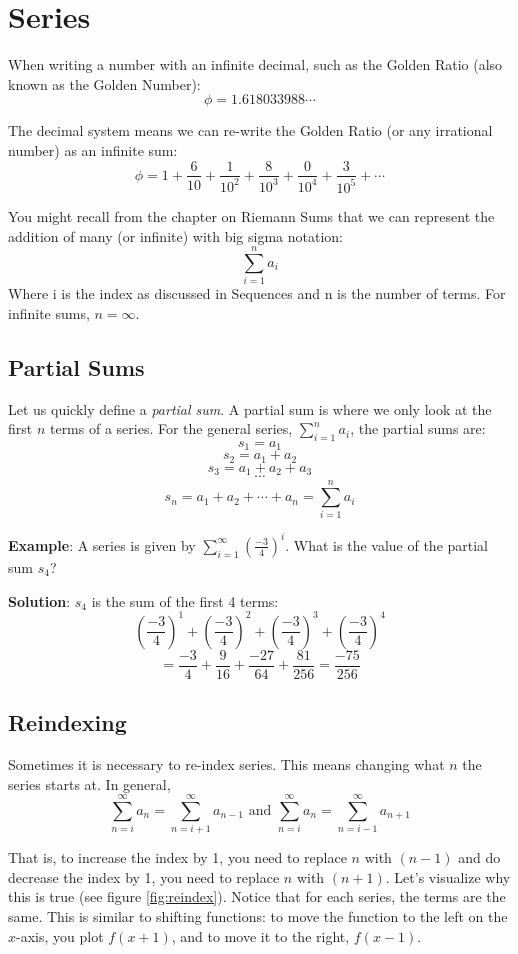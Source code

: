 \chapter{Series}
When writing a number with an infinite decimal, such as the Golden 
Ratio (also known as the Golden Number):
$$\phi = 1.618033988 \cdots$$

The decimal system means we can re-write the Golden Ratio (or any 
irrational number) as an infinite sum:
$$\phi = 1 + \frac{6}{10} + \frac{1}{10^2} + \frac{8}{10^3} + 
\frac{0}{10^4} + \frac{3}{10^5} + \cdots$$

You might recall from the chapter on Riemann Sums that we can 
represent the addition of many (or infinite) with big sigma notation:
$$\sum_{i = 1}^n a_i$$
Where i is the index as discussed in Sequences and n is the number of 
terms. For infinite sums, $n = \infty$.

\section{Partial Sums}
Let us quickly define a \textit{partial sum}. A partial sum is where 
we only look at the first $n$ terms of a series. For the general 
series, $\sum_{i=1}^{n} a_i$, the partial sums are:
$$s_1 = a_1$$
$$s_2 = a_1 + a_2$$
$$s_3 = a_1 + a_2 + a_3$$
$$\cdots$$
$$s_n = a_1 + a_2 + \cdots + a_n = \sum_{i=1}^{n} a_i$$

\textbf{Example}: A series is given by $\sum_{i=1}^\infty 
(\frac{-3}{4})^i$. What is the value of the partial sum $s_4$?

\textbf{Solution}: $s_4$ is the sum of the first 4 terms: 
$$(\frac{-3}{4})^1 + (\frac{-3}{4})^2 + (\frac{-3}{4})^3 + (\frac{-3}{4})^4$$
$$= \frac{-3}{4} + \frac{9}{16} + \frac{-27}{64} + \frac{81}{256} = 
\frac{-75}{256}$$

\section{Reindexing}
Sometimes it is necessary to re-index series. This means changing what $n$ the 
series starts at. In general,
$$\sum_{n=i}^\infty a_n = \sum_{n=i + 1}^\infty a_{n-1} \text{ and } \sum_{n=i}^
\infty a_n = \sum_{n=i - 1}^\infty a_{n+1}$$

That is, to increase the index by 1, you need to replace $n$ with $(n-1)$ and 
do decrease the index by 1, you need to replace $n$ with $(n+1)$. Let's 
visualize why this is true (see figure \ref{fig:reindex}). Notice that for 
each series, the terms are the same. This is similar to shifting functions: 
to move the function to the left on the $x$-axis, you plot $f(x + 1)$, and to 
move it to the right, $f(x - 1)$. 

